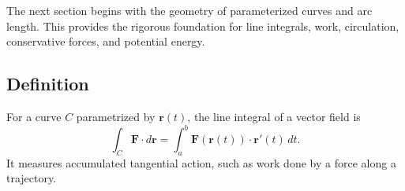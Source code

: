 \begin{lookingaheadbox}
The next section begins with the geometry of parameterized curves and arc
length. This provides the rigorous foundation for line integrals, work,
circulation, conservative forces, and potential energy.
\end{lookingaheadbox}

\subsection{Definition}
For a curve $C$ parametrized by $\mathbf r(t)$, the line integral of a vector field is
\[
\int_C \mathbf F\cdot d\mathbf r
=\int_a^b \mathbf F(\mathbf r(t))\cdot \mathbf r'(t)\,dt.
\]
It measures accumulated tangential action, such as work done by a force along a trajectory.
